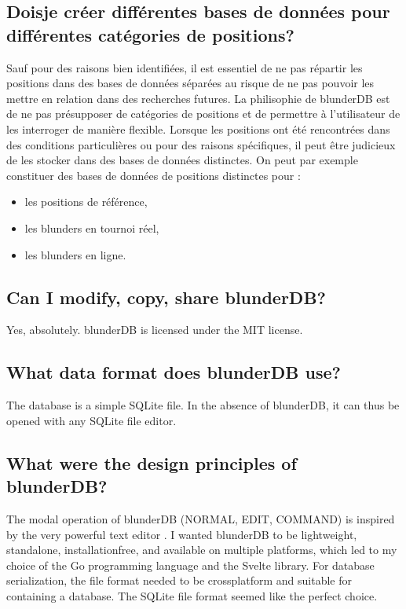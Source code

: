 \documentclass[letterpaper,10pt,english]{sphinxmanual}
\begin{document}
\subsection{Dois\sphinxhyphen{}je créer différentes bases de données pour différentes catégories de positions?}
\label{\detokenize{faq:dois-je-creer-differentes-bases-de-donnees-pour-differentes-categories-de-positions}}
\sphinxAtStartPar
Sauf pour des raisons bien identifiées, il est essentiel de ne pas
répartir les positions dans des bases de données séparées au risque
de ne pas pouvoir les mettre en relation dans des recherches futures.
La philisophie de blunderDB est de ne pas présupposer de catégories de
positions  et de permettre à l’utilisateur de les interroger
de manière flexible. Lorsque les positions ont été rencontrées dans des conditions
particulières ou pour des raisons spécifiques, il peut être judicieux de les
stocker dans des bases de données distinctes.
On peut par exemple constituer des bases de données de positions distinctes
pour :
\begin{itemize}
\item {} 
\sphinxAtStartPar
les positions de référence,

\item {} 
\sphinxAtStartPar
les blunders en tournoi réel,

\item {} 
\sphinxAtStartPar
les blunders en ligne.

\end{itemize}


\subsection{Can I modify, copy, share blunderDB?}
\label{\detokenize{faq:puis-je-modifier-copier-partager-blunderdb}}
\sphinxAtStartPar
Yes, absolutely. blunderDB is licensed under the MIT license.


\subsection{What data format does blunderDB use?}
\label{\detokenize{faq:quel-format-de-donnees-utilise-blunderdb}}
\sphinxAtStartPar
The database is a simple SQLite file. In the absence of blunderDB, it can thus be opened with any SQLite file editor.


\subsection{What were the design principles of blunderDB?}
\label{\detokenize{faq:quelles-ont-ete-les-principes-de-conception-de-blunderdb}}
\sphinxAtStartPar
The modal operation of blunderDB (NORMAL, EDIT, COMMAND) is inspired by the very powerful text editor . I wanted blunderDB to be lightweight, standalone, installation\sphinxhyphen{}free, and available on multiple platforms, which led to my choice of the Go programming language and the Svelte library. For database serialization, the file format needed to be cross\sphinxhyphen{}platform and suitable for containing a database. The SQLite file format seemed like the perfect choice.
\end{document}
